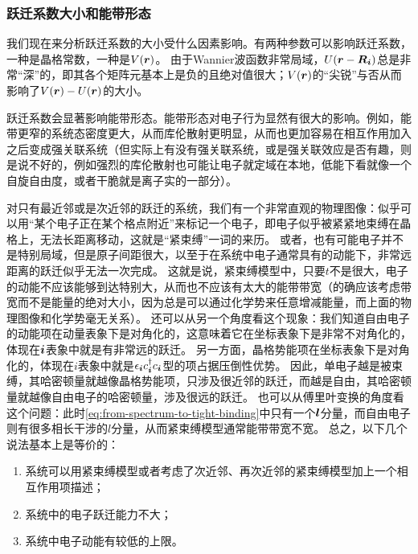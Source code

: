 \subsubsection{跃迁系数大小和能带形态}\label{sec:hopping-and-band-shape}

我们现在来分析跃迁系数的大小受什么因素影响。有两种参数可以影响跃迁系数，一种是晶格常数，一种是$V(\vb*{r})$。
由于Wannier波函数非常局域，$U(\vb*{r} - \vb*{R}_{\vb*{i}})$总是非常“深”的，即其各个矩阵元基本上是负的且绝对值很大；$V(\vb*{r})$的“尖锐”与否从而影响了$V(\vb*{r}) - U(\vb*{r})$的大小。

跃迁系数会显著影响能带形态。能带形态对电子行为显然有很大的影响。例如，能带更窄的系统态密度更大，从而库伦散射更明显，从而也更加容易在相互作用加入之后变成强关联系统（但实际上有没有强关联系统，或是强关联效应是否有趣，则是说不好的，例如强烈的库伦散射也可能让电子就定域在本地，低能下看就像一个自旋自由度，或者干脆就是离子实的一部分）。


对只有最近邻或是次近邻的跃迁的系统，我们有一个非常直观的物理图像：似乎可以用“某个电子正在某个格点附近”来标记一个电子，即电子似乎被紧紧地束缚在晶格上，无法长距离移动，这就是“紧束缚”一词的来历。
或者，也有可能电子并不是特别局域，但是原子间距很大，以至于在系统中电子通常具有的动能下，非常远距离的跃迁似乎无法一次完成。
这就是说，紧束缚模型中，只要$t$不是很大，电子的动能不应该能够到达特别大，从而也不应该有太大的能带带宽（的确应该考虑带宽而不是能量的绝对大小，因为总是可以通过化学势来任意增减能量，而上面的物理图像和化学势毫无关系）。
还可以从另一个角度看这个现象：我们知道自由电子的动能项在动量表象下是对角化的，这意味着它在坐标表象下是非常不对角化的，体现在$\vb*{i}$表象中就是有非常远的跃迁。
另一方面，晶格势能项在坐标表象下是对角化的，体现在$i$表象中就是$\epsilon_{\vb*{i}} c^\dagger_{\vb*{i}} c_{\vb*{i}}$型的项占据压倒性优势。
因此，单电子越是被束缚，其哈密顿量就越像晶格势能项，只涉及很近邻的跃迁，而越是自由，其哈密顿量就越像自由电子的哈密顿量，涉及很远的跃迁。
也可以从傅里叶变换的角度看这个问题：此时\eqref{eq:from-spectrum-to-tight-binding}中只有一个$\vb*{l}$分量，而自由电子则有很多相长干涉的$l$分量，从而紧束缚模型通常能带带宽不宽。
总之，以下几个说法基本上是等价的：
\begin{enumerate}
    \item 系统可以用紧束缚模型或者考虑了次近邻、再次近邻的紧束缚模型加上一个相互作用项描述；
    \item 系统中的电子跃迁能力不大；
    \item 系统中电子动能有较低的上限。
\end{enumerate}

